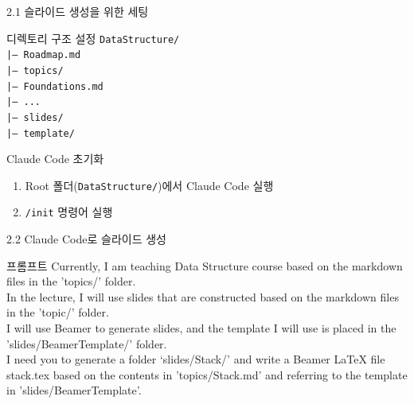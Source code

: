 \documentclass[aspectratio=169,xcolor=dvipsnames]{beamer}
\begin{document}
\begin{frame}{2.1 슬라이드 생성을 위한 세팅}
  \begin{block}{디렉토리 구조 설정}
    \texttt{DataStructure/}\\
    \hspace{0.5cm}\texttt{|-- Roadmap.md}\\
    \hspace{0.5cm}\texttt{|-- topics/}\\
    \hspace{1cm}\texttt{|-- Foundations.md}\\
    \hspace{1cm}\texttt{|-- ...}\\
    \hspace{0.5cm}\texttt{|-- slides/}\\
    \hspace{1cm}\texttt{|-- template/}\\
  \end{block}

  \vspace{0.5cm}

  \begin{exampleblock}{Claude Code 초기화}
    \begin{enumerate}
      \item Root 폴더(\texttt{DataStructure/})에서 Claude Code 실행
      \item \texttt{/init} 명령어 실행
    \end{enumerate}
  \end{exampleblock}
\end{frame}

\begin{frame}{2.2 Claude Code로 슬라이드 생성}
  \begin{alertblock}{프롬프트}
    Currently, I am teaching Data Structure course based on the markdown files in the 'topics/' folder.\\\vspace{1em}
    In the lecture, I will use slides that are constructed based on the markdown files in the 'topic/' folder.\\\vspace{1em}
    I will use Beamer to generate slides, and the template I will use is placed in the 'slides/BeamerTemplate/' folder.\\\vspace{1em}
    I need you to generate a folder ‘slides/Stack/’ and write a Beamer LaTeX file stack.tex based on the contents in 'topics/Stack.md' and referring to the template in 'slides/BeamerTemplate'.
  \end{alertblock}
\end{frame}
\end{document}
